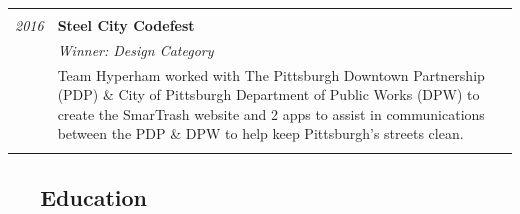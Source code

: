 \documentclass[]{article}
\def\graduationcap{{\FA \faGraduationCap}}
\begin{document}
\begin{multicols}{2}
\begin{longtable}[c]{@{}ll@{}}
\toprule
\begin{minipage}[t]{0.20\columnwidth}\raggedright\strut
\strut\end{minipage} &
\begin{minipage}[t]{0.74\columnwidth}\raggedright\strut
\strut\end{minipage}\tabularnewline
\begin{minipage}[t]{0.20\columnwidth}\raggedright\strut
\color{grey} \emph{2016}
\strut\end{minipage} &
\begin{minipage}[t]{0.74\columnwidth}\raggedright\strut
\textbf{Steel City Codefest}
\strut\end{minipage}\tabularnewline
\begin{minipage}[t]{0.20\columnwidth}\raggedright\strut
\strut\end{minipage} &
\begin{minipage}[t]{0.74\columnwidth}\raggedright\strut
\emph{Winner: Design Category}
\strut\end{minipage}\tabularnewline
\begin{minipage}[t]{0.20\columnwidth}\raggedright\strut
\strut\end{minipage} &
\begin{minipage}[t]{0.74\columnwidth}\raggedright\strut
\color{grey} Team Hyperham worked with The Pittsburgh Downtown
Partnership (PDP) \& City of Pittsburgh Department of Public Works (DPW)
to create the SmarTrash website and 2 apps to assist in communications
between the PDP \& DPW to help keep Pittsburgh's streets clean.
\strut\end{minipage}\tabularnewline
\begin{minipage}[t]{0.20\columnwidth}\raggedright\strut
\strut\end{minipage} &
\begin{minipage}[t]{0.74\columnwidth}\raggedright\strut
\strut\end{minipage}\tabularnewline
\bottomrule
\end{longtable}

\subsection{\texorpdfstring{\color{blue} \graduationcap ~~
Education}{ ~~ Education}}\label{education}


\end{multicols}
\end{document}
